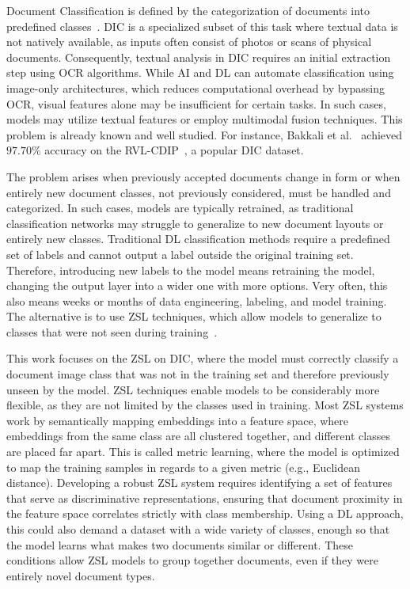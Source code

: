Document Classification is defined by the categorization of documents into predefined classes~\cite{liu_document_2021}.
\acrfull{DIC} is a specialized subset of this task where textual data is not natively available, as inputs often consist of photos or scans of physical documents.
Consequently, textual analysis in \gls{DIC} requires an initial extraction step using \gls{OCR} algorithms.
While \gls{AI} and \acrfull{DL} can automate classification using image-only architectures, which reduces computational overhead by bypassing \gls{OCR}, visual features alone may be insufficient for certain tasks.
In such cases, models may utilize textual features or employ multimodal fusion techniques.
This problem is already known and well studied.
For instance, Bakkali et al.~\cite{bakkali_eaml_2021} achieved $97.70\%$ accuracy on the \gls{RVL-CDIP}~\cite{harley_evaluation_2015}, a popular \gls{DIC} dataset.

The problem arises when previously accepted documents change in form or when entirely new document classes, not previously considered, must be handled and categorized. In such cases, models are typically retrained, as traditional classification networks may struggle to generalize to new document layouts or entirely new classes. Traditional \gls{DL} classification methods require a predefined set of labels and cannot output a label outside the original training set. Therefore, introducing new labels to the model means retraining the model, changing the output layer into a wider one with more options. Very often, this also means weeks or months of data engineering, labeling, and model training. The alternative is to use \acrfull{ZSL} techniques, which allow models to generalize to classes that were not seen during training~\cite{xian_zero-shot_2019}.

This work focuses on the \gls{ZSL} on \gls{DIC}, where the model must correctly classify a document image class that was not in the training set and therefore previously unseen by the model. \gls{ZSL} techniques enable models to be considerably more flexible, as they are not limited by the classes used in training. Most \gls{ZSL} systems work by semantically mapping embeddings into a feature space, where embeddings from the same class are all clustered together, and different classes are placed far apart. This is called metric learning, where the model is optimized to map the training samples in regards to a given metric (e.g., Euclidean distance). Developing a robust \gls{ZSL} system requires identifying a set of features that serve as discriminative representations, ensuring that document proximity in the feature space correlates strictly with class membership. Using a \gls{DL} approach, this could also demand a dataset with a wide variety of classes, enough so that the model learns what makes two documents similar or different. These conditions allow \gls{ZSL} models to group together documents, even if they were entirely novel document types.

